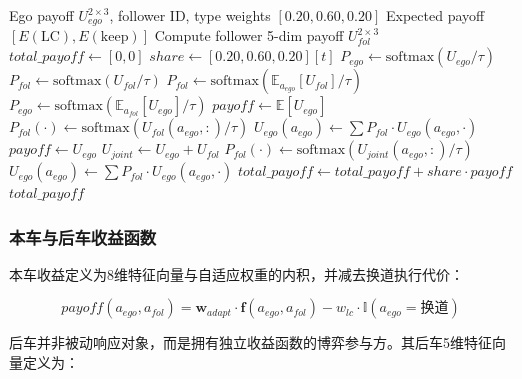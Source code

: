 \begin{algorithm}[H]
\caption{混合博弈求解流程}
\label{alg:hybrid_game}
\begin{algorithmic}
\REQUIRE Ego payoff $U_{ego}^{2\times3}$, follower ID, type weights $[0.20,0.60,0.20]$
\ENSURE Expected payoff $[E(\mathrm{LC}), E(\mathrm{keep})]$
\STATE Compute follower 5-dim payoff $U_{fol}^{2\times3}$
\STATE $total\_payoff \leftarrow [0, 0]$
    \STATE $share \leftarrow [0.20, 0.60, 0.20][t]$
     
        \STATE $P_{ego} \leftarrow \mathrm{softmax}(U_{ego}/\tau)$
        \STATE $P_{fol} \leftarrow \mathrm{softmax}(U_{fol}/\tau)$
            \STATE $P_{fol} \leftarrow \mathrm{softmax}(\mathbb{E}_{a_{ego}}[U_{fol}] / \tau)$
            \STATE $P_{ego} \leftarrow \mathrm{softmax}(\mathbb{E}_{a_{fol}}[U_{ego}] / \tau)$
        \ENDFOR
        \STATE $payoff \leftarrow \mathbb{E}[U_{ego}]$
    \ELSE
         
                \STATE $P_{fol}(\cdot) \leftarrow \mathrm{softmax}(U_{fol}(a_{ego},:) / \tau)$
                \STATE $U_{ego}(a_{ego}) \leftarrow \sum P_{fol} \cdot U_{ego}(a_{ego}, \cdot)$
            \ENDFOR
            \STATE $payoff \leftarrow U_{ego}$
        \ELSE {}
            \STATE $U_{joint} \leftarrow U_{ego} + U_{fol}$
                \STATE $P_{fol}(\cdot) \leftarrow \mathrm{softmax}(U_{joint}(a_{ego},:) / \tau)$
                \STATE $U_{ego}(a_{ego}) \leftarrow \sum P_{fol} \cdot U_{ego}(a_{ego}, \cdot)$
            \ENDFOR
        \ENDIF
    \ENDIF
    \STATE $total\_payoff \leftarrow total\_payoff + share \cdot payoff$
\ENDFOR
\RETURN $total\_payoff$
\end{algorithmic}
\end{algorithm}

\subsubsection{本车与后车收益函数}
本车收益定义为8维特征向量与自适应权重的内积，并减去换道执行代价：

\begin{equation}
payoff(a_{ego}, a_{fol}) = \mathbf{w}_{adapt} \cdot \mathbf{f}(a_{ego}, a_{fol}) - w_{lc} \cdot \mathbb{I}(a_{ego}=\text{换道})
\end{equation}

后车并非被动响应对象，而是拥有独立收益函数的博弈参与方。其后车5维特征向量定义为：

